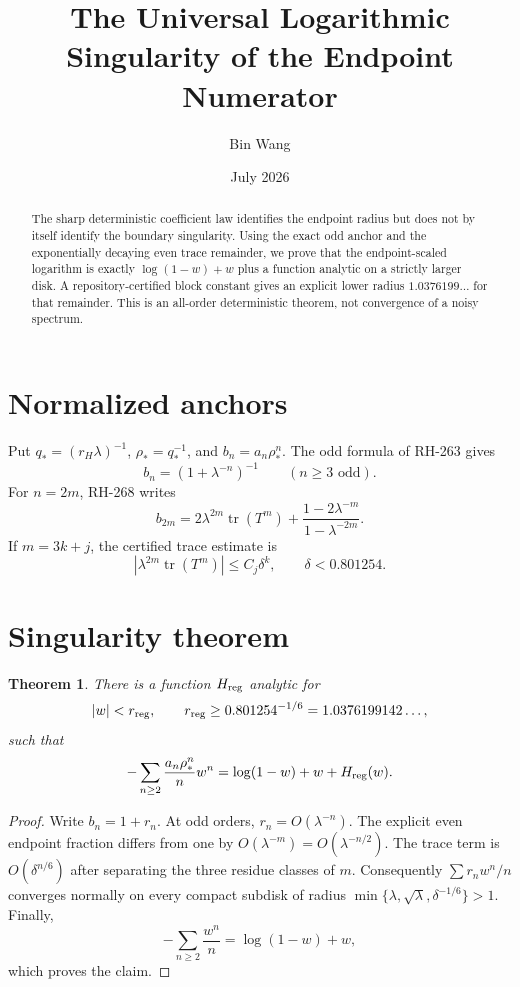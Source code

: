 \documentclass[11pt]{article}
\title{The Universal Logarithmic Singularity of the Endpoint Numerator}
\author{Bin Wang}\date{July 2026}
\newtheorem{theorem}{Theorem}[section]
\theoremstyle{remark}\newtheorem{remark}[theorem]{Remark}
\begin{document}
\maketitle
\begin{abstract}
The sharp deterministic coefficient law identifies the endpoint radius but
does not by itself identify the boundary singularity.  Using the exact odd
anchor and the exponentially decaying even trace remainder, we prove that
the endpoint-scaled logarithm is exactly $\log(1-w)+w$ plus a function
analytic on a strictly larger disk.  A repository-certified block constant
gives an explicit lower radius $1.0376199\ldots$ for that remainder.  This is
an all-order deterministic theorem, not convergence of a noisy spectrum.
\end{abstract}

\section{Normalized anchors}
Put $q_*=(r_H\lambda)^{-1}$, $\rho_*=q_*^{-1}$, and
$b_n=a_n\rho_*^n$.  The odd formula of RH-263 gives
\[
 b_n=(1+\lambda^{-n})^{-1}\qquad(n\ge3\text{ odd}).
\]
For $n=2m$, RH-268 writes
\[
 b_{2m}=2\lambda^{2m}\operatorname{tr}(T^m)
       +\frac{1-2\lambda^{-m}}{1-\lambda^{-2m}}.
\]
If $m=3k+j$, the certified trace estimate is
\[
 |\lambda^{2m}\operatorname{tr}(T^m)|
 \le C_j\delta^k,\qquad \delta<0.801254.
\]

\section{Singularity theorem}
\begin{theorem}
There is a function $H_{\rm reg}$ analytic for
\[
 |w|<r_{\rm reg},\qquad
 r_{\rm reg}\ge0.801254^{-1/6}=1.0376199142\ldots,
\]
such that
\[
 -\sum_{n\ge2}\frac{a_n\rho_*^n}{n}w^n
 =\log(1-w)+w+H_{\rm reg}(w).
\]
\end{theorem}
\begin{proof}
Write $b_n=1+r_n$.  At odd orders, $r_n=O(\lambda^{-n})$.
The explicit even endpoint fraction differs from one by
$O(\lambda^{-m})=O(\lambda^{-n/2})$.  The trace term is
$O(\delta^{n/6})$ after separating the three residue classes of $m$.
Consequently $\sum r_nw^n/n$ converges normally on every compact subdisk of
radius $\min\{\lambda,\sqrt\lambda,\delta^{-1/6}\}>1$.  Finally,
\[
 -\sum_{n\ge2}\frac{w^n}{n}=\log(1-w)+w,
\]
which proves the claim.
\end{proof}
\end{document}
